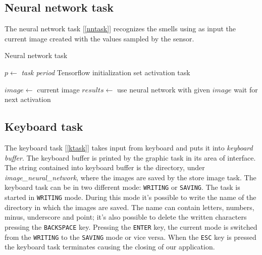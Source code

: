 \documentclass[12pt]{article}
\begin{document}
\subsection{Neural network task}
The neural network task [\ref{nntask}] recognizes the smells using as input the
current image created with the values sampled by the sensor.

\begin{algorithm}[H]
\caption{Neural network task}
\label{nntask}

\begin{algorithmic}
\State $p\gets$ \textit{task period}
\State Tensorflow initialization
\State set activation task

\Loop
\State $image\gets$ current image
\State $results\gets$ use neural network with given $image$
\State wait for next activation
\EndLoop

\end{algorithmic}
\end{algorithm}

\subsection{Keyboard task}
The keyboard task [\ref{ktask}] takes input from keyboard and puts it into
\textit{keyboard buffer}. The keyboard buffer is printed by the graphic task
in its area of interface. The string contained into keyboard buffer is the
directory, under \textit{image\_neural\_network}, where the images are saved
by the store image task. The keyboard task can be in two different mode:
\texttt{WRITING} or \texttt{SAVING}. The task is started in \texttt{WRITING}
mode. During this mode it's possible to write the name of the directory in
which the images are saved. The name can contain letters, numbers, minus,
underscore and point; it's also possible to delete the written characters
pressing the \texttt{BACKSPACE} key. Pressing the \texttt{ENTER} key, the
current mode is switched from the \texttt{WRITING} to the \texttt{SAVING}
mode or vice versa. When the \texttt{ESC} key is pressed the keyboard task
terminates causing the closing of our application.
\end{document}
